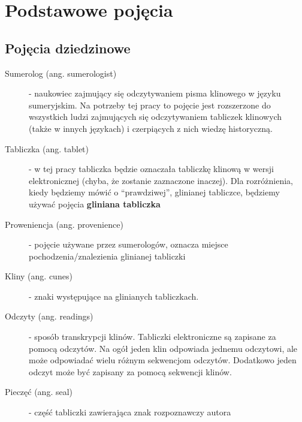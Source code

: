 \chapter{Podstawowe pojęcia}\label{r:pojecia}
\section{Pojęcia dziedzinowe}
\begin{description}
 \item[Sumerolog (ang. sumerologist)] - naukowiec zajmujący się odczytywaniem pisma klinowego w języku sumeryjskim. Na potrzeby tej pracy
		      to pojęcie jest rozszerzone do wszystkich ludzi zajmujących się odczytywaniem tabliczek klinowych (także w innych językach) i czerpiących z nich wiedzę historyczną.
 \item[Tabliczka (ang. tablet)] - w tej pracy tabliczka będzie oznaczała tabliczkę klinową w wersji elektronicznej 
		  (chyba, że zostanie zaznaczone inaczej). Dla rozróżnienia, kiedy będziemy mówić o ``prawdziwej'', 
		  glinianej tabliczce, będziemy używać pojęcia \textbf{gliniana tabliczka}
 \item[Proweniencja (ang. provenience)] - pojęcie używane przez sumerologów, oznacza miejsce pochodzenia/znalezienia glinianej tabliczki
 \item[Kliny (ang. cunes)] - znaki występujące na glinianych tabliczkach.
 \item[Odczyty (ang. readings)] - sposób transkrypcji klinów. Tabliczki elektroniczne są zapisane za pomocą odczytów. 
Na ogół jeden klin odpowiada jednemu odczytowi, ale może odpowiadać wielu różnym sekwencjom odczytów. 
Dodatkowo jeden odczyt może być zapisany za pomocą sekwencji klinów.
 \item[Pieczęć (ang. seal)] - część tabliczki zawierająca znak rozpoznawczy autora
\end{description}

